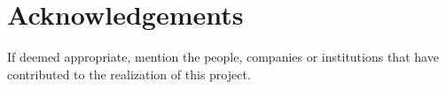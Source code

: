 \chapter*{Acknowledgements}

If deemed appropriate, mention the people, companies or institutions that have contributed to the realization of this project.